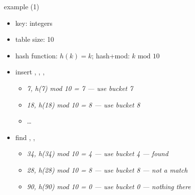 \begin{frame}{example (1)}
    \begin{itemize}
    \item key: integers
    \item table size: 10
    \item hash function: $h(k) = k$; hash+mod: $k \text{~mod~} 10$
    \item insert , , , 
        \begin{itemize}
            \item<2-> \textit<2>{7, h(7) mod 10 = 7 --- use bucket 7}
            \item<3-> \textit<3>{18, h(18) mod 10 = 8 --- use bucket 8}
            \item<3-> \ldots
        \end{itemize}
    \item<6-> find , , 
        \begin{itemize}
            \item<6-> \textit<6>{34, h(34) mod 10 = 4 --- use bucket 4 --- found}
            \item<7-> \textit<7>{28, h(28) mod 10 = 8 --- use bucket 8 --- not a match}
            \item<8-> \textit<8>{90, h(90) mod 10 = 0 --- use bucket 0 --- nothing there}
        \end{itemize}
    \end{itemize}
\end{frame}

